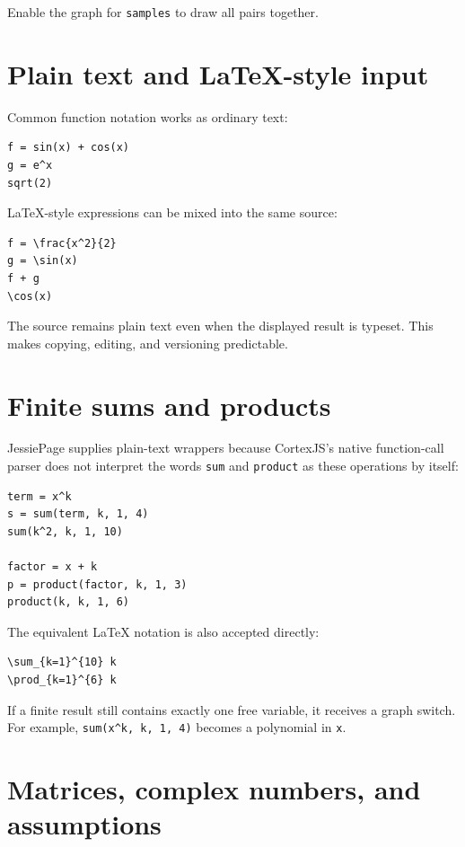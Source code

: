 \documentclass[11pt,a4paper]{article}
\newcommand{\code}[1]{\texttt{#1}}
\begin{document}
Enable the graph for \code{samples} to draw all pairs together.

\section{Plain text and LaTeX-style input}

Common function notation works as ordinary text:

\begin{lstlisting}[style=jessie]
f = sin(x) + cos(x)
g = e^x
sqrt(2)
\end{lstlisting}

LaTeX-style expressions can be mixed into the same source:

\begin{lstlisting}[style=jessie]
f = \frac{x^2}{2}
g = \sin(x)
f + g
\cos(x)
\end{lstlisting}

The source remains plain text even when the displayed result is typeset. This makes copying, editing, and versioning predictable.

\section{Finite sums and products}

JessiePage supplies plain-text wrappers because CortexJS's native function-call parser does not interpret the words \code{sum} and \code{product} as these operations by itself:

\begin{lstlisting}[style=jessie]
term = x^k
s = sum(term, k, 1, 4)
sum(k^2, k, 1, 10)

factor = x + k
p = product(factor, k, 1, 3)
product(k, k, 1, 6)
\end{lstlisting}

The equivalent LaTeX notation is also accepted directly:

\begin{lstlisting}[style=jessie]
\sum_{k=1}^{10} k
\prod_{k=1}^{6} k
\end{lstlisting}

If a finite result still contains exactly one free variable, it receives a graph switch. For example, \code{sum(x\textasciicircum{}k, k, 1, 4)} becomes a polynomial in \code{x}.

\section{Matrices, complex numbers, and assumptions}
\end{document}
